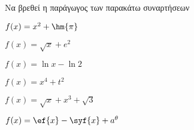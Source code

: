 Να βρεθεί η παράγωγος των παρακάτω συναρτήσεων
\begin{alist}
\item $ f(x)=x^2+\hm{\pi} $
\item $ f(x)=\sqrt{x}+e^2 $
\item $ f(x)=\ln{x}-\ln{2} $
\item $ f(x)=x^4+t^2 $
\item $ f(x)=\sqrt{x}+x^3+\sqrt{3} $
\item $ f(x)=\ef{x}-\syf{x}+a^{\theta} $
\end{alist}

